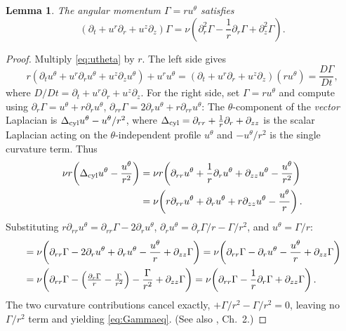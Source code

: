 \documentclass{article}
\newtheorem{lemma}[theorem]{Lemma}
\theoremstyle{definition}
\theoremstyle{remark}
\begin{document}
\begin{lemma}\label{lem:Gammaeq}
  The angular momentum $\Gamma = r u^\theta$ satisfies
  \begin{equation}\label{eq:Gammaeq}
    (\partial_t + u^r\partial_r + u^z\partial_z)\Gamma
    = \nu\!\left(\partial_r^2\Gamma - \frac{1}{r}\partial_r\Gamma
      + \partial_z^2\Gamma\right).
  \end{equation}
\end{lemma}
\begin{proof}
Multiply \eqref{eq:utheta} by $r$.  The left side gives
\[
  r(\partial_t u^\theta + u^r\partial_r u^\theta + u^z\partial_z u^\theta)
  + u^r u^\theta
  = (\partial_t + u^r\partial_r + u^z\partial_z)(ru^\theta)
  = \frac{D\Gamma}{Dt},
\]
where $D/Dt = \partial_t + u^r\partial_r + u^z\partial_z$.  For the right
side, set $\Gamma = r u^\theta$ and compute using $\partial_r\Gamma = u^\theta
+ r\partial_r u^\theta$, $\partial_{rr}\Gamma = 2\partial_r u^\theta
+ r\partial_{rr}u^\theta$:
The $\theta$-component of the \emph{vector} Laplacian is
$\Delta_{\rm cyl}u^\theta - u^\theta/r^2$, where
$\Delta_{\rm cyl} = \partial_{rr} + \frac{1}{r}\partial_r + \partial_{zz}$
is the scalar Laplacian acting on the $\theta$-independent profile
$u^\theta$ and $-u^\theta/r^2$ is the single curvature term.  Thus
\begin{align*}
  \nu r\!\left(\Delta_{\rm cyl}u^\theta - \frac{u^\theta}{r^2}\right)
  &= \nu r\!\left(\partial_{rr}u^\theta + \frac{1}{r}\partial_r u^\theta
    + \partial_{zz}u^\theta - \frac{u^\theta}{r^2}\right)\\
  &= \nu\!\left(r\partial_{rr}u^\theta + \partial_r u^\theta
    + r\partial_{zz}u^\theta - \frac{u^\theta}{r}\right).
\end{align*}
Substituting $r\partial_{rr}u^\theta = \partial_{rr}\Gamma
- 2\partial_r u^\theta$, $\partial_r u^\theta = \partial_r\Gamma/r - \Gamma/r^2$,
and $u^\theta = \Gamma/r$:
\begin{align*}
  &= \nu\!\left(\partial_{rr}\Gamma - 2\partial_r u^\theta
    + \partial_r u^\theta - \frac{u^\theta}{r} + \partial_{zz}\Gamma\right)
  = \nu\!\left(\partial_{rr}\Gamma - \partial_r u^\theta
    - \frac{u^\theta}{r} + \partial_{zz}\Gamma\right)\\
  &= \nu\!\left(\partial_{rr}\Gamma
    - \Bigl(\tfrac{\partial_r\Gamma}{r} - \tfrac{\Gamma}{r^2}\Bigr)
    - \frac{\Gamma}{r^2} + \partial_{zz}\Gamma\right)
  = \nu\!\left(\partial_{rr}\Gamma - \frac{1}{r}\partial_r\Gamma
    + \partial_{zz}\Gamma\right).
\end{align*}
The two curvature contributions cancel exactly,
$+\Gamma/r^2 - \Gamma/r^2 = 0$, leaving no $\Gamma/r^2$ term and yielding
\eqref{eq:Gammaeq}. \quad (See also \cite{MajdaBertozzi}, Ch.~2.)
\end{proof}
\end{document}
